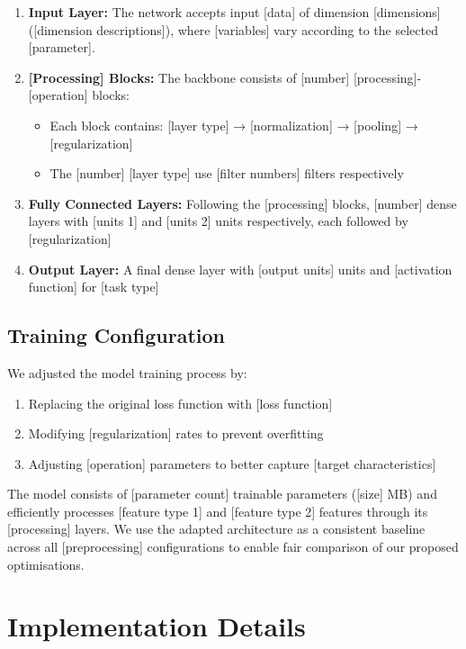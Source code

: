 \begin{enumerate}
\item \textbf{Input Layer:} The network accepts input [data] of dimension [dimensions] ([dimension descriptions]), where [variables] vary according to the selected [parameter].

\item \textbf{[Processing] Blocks:} The backbone consists of [number] [processing]-[operation] blocks:
    \begin{itemize}
    \item Each block contains: [layer type] → [normalization] → [pooling] → [regularization]
    \item The [number] [layer type] use [filter numbers] filters respectively
    \end{itemize}

\item \textbf{Fully Connected Layers:} Following the [processing] blocks, [number] dense layers with [units 1] and [units 2] units respectively, each followed by [regularization]

\item \textbf{Output Layer:} A final dense layer with [output units] units and [activation function] for [task type]
\end{enumerate}

\subsection{Training Configuration}

We adjusted the model training process by:
\begin{enumerate}
\item Replacing the original loss function with [loss function]
\item Modifying [regularization] rates to prevent overfitting
\item Adjusting [operation] parameters to better capture [target characteristics]
\end{enumerate}

The model consists of [parameter count] trainable parameters ([size] MB) and efficiently processes [feature type 1] and [feature type 2] features through its [processing] layers. We use the adapted architecture as a consistent baseline across all [preprocessing] configurations to enable fair comparison of our proposed optimisations.

\section{Implementation Details}

